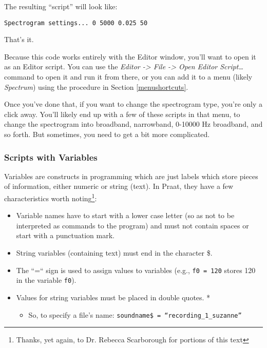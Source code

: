 The resulting ``script'' will look like:

\begin{verbatim} 
Spectrogram settings... 0 5000 0.025 50
\end{verbatim}

That's it.

Because this code works entirely with the Editor window, you'll want to
open it as an Editor script. You can use the \emph{Editor
-\textgreater{} File -\textgreater{} Open Editor Script\ldots{}} command
to open it and run it from there, or you can add it to a menu (likely
\emph{Spectrum}) using the procedure in Section \ref{menushortcuts}.

Once you've done that, if you want to change the spectrogram type,
you're only a click away. You'll likely end up with a few of these
scripts in that menu, to change the spectrogram into broadband,
narrowband, 0-10000 Hz broadband, and so forth. But sometimes, you need
to get a bit more complicated.

\hypertarget{scripts-with-variables}{%
\subsubsection{Scripts with Variables}\label{scripts-with-variables}}

Variables are constructs in programming which are just labels which
store pieces of information, either numeric or string (text). In Praat,
they have a few characteristics worth
noting\footnote{Thanks, yet again, to Dr. Rebecca Scarborough for portions of this text}:

\begin{itemize}
\tightlist
\item
  Variable names have to start with a lower case letter (so as not to be
  interpreted as commands to the program) and must not contain spaces or
  start with a punctuation mark.
\item
  String variables (containing text) must end in the character \$.
\item
  The ``=`` sign is used to assign values to variables (e.g.,
  \texttt{f0 = 120} stores 120 in the variable \texttt{f0}).
\item
  Values for string variables must be placed in double quotes. *

  \begin{itemize}
  \tightlist
  \item
    So, to specify a file's name:
    \texttt{soundname\$ = “recording\_1\_suzanne”}
  \end{itemize}
\end{itemize}

